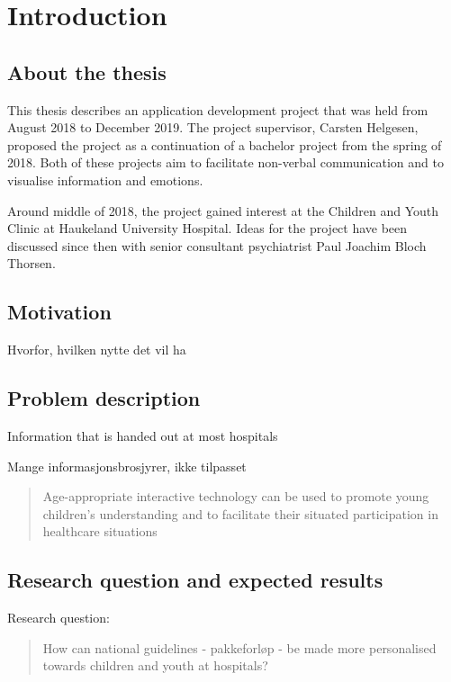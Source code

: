 \chapter{Introduction}
\label{ch:introduction}

\section{About the thesis}

This thesis describes an application development project that was held from August 2018 to December 2019. The project supervisor, Carsten Helgesen, proposed the project as a continuation of a bachelor project from the spring of 2018. Both of these projects aim to facilitate non-verbal communication and to visualise information and emotions.

Around middle of 2018, the project gained interest at the Children and Youth Clinic at Haukeland University Hospital. Ideas for the project have been discussed since then with senior consultant psychiatrist Paul Joachim Bloch Thorsen.

\section{Motivation}

Hvorfor, hvilken nytte det vil ha

\section{Problem description}



Information that is handed out at most hospitals 

Mange informasjonsbrosjyrer, ikke tilpasset

\begin{quote}
    Age-appropriate interactive technology can be used to promote young children’s understanding and to facilitate their situated participation in healthcare situations \cite{stalberg2018}
\end{quote}

\section{Research question and expected results}

Research question:

\begin{quote}
    How can national guidelines - pakkeforløp - be made more personalised towards children and youth at hospitals?
\end{quote}

